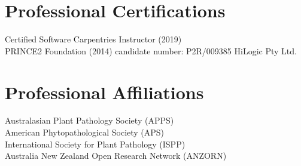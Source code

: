 \section*{Professional Certifications}
  Certified Software Carpentries Instructor (2019)\\[3 mm]
  PRINCE2 Foundation (2014) candidate number: P2R/009385  HiLogic Pty Ltd.

\section*{Professional Affiliations}
  Australasian Plant Pathology Society (APPS)\\[3 mm]
  American Phytopathological Society (APS)\\[3 mm]
  International Society for Plant Pathology (ISPP)\\[3 mm]
  Australia New Zealand Open Research Network (ANZORN)\\

